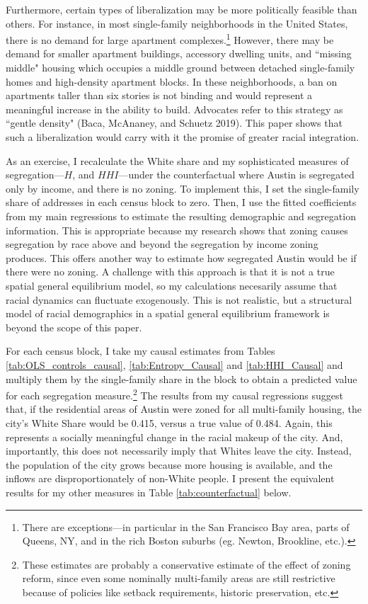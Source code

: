 \documentclass[11pt]{article}
\begin{document}
Furthermore, certain types of liberalization may be more politically feasible than others. For instance, in most single-family neighborhoods in the United States, there is no demand for large apartment complexes.\footnote{There are exceptions---in particular in the San Francisco Bay area, parts of Queens, NY, and in the rich Boston suburbs (eg. Newton, Brookline, etc.).} However, there may be demand for smaller apartment buildings, accessory dwelling units, and ``missing middle" housing which occupies a middle ground between detached single-family homes and high-density apartment blocks. In these neighborhoods, a ban on apartments taller than six stories is not binding and would represent a meaningful increase in the ability to build. Advocates refer to this strategy as ``gentle density" (Baca, McAnaney, and Schuetz 2019). This paper shows that such a liberalization would carry with it the promise of greater racial integration.

As an exercise, I recalculate the White share and my sophisticated measures of segregation---$H$, and $HHI$---under the counterfactual where Austin is segregated only by income, and there is no zoning. To implement this, I set the single-family share of addresses in each census block to zero. Then, I use the fitted coefficients from my main regressions to estimate the resulting demographic and segregation information. This is appropriate because my research shows that zoning causes segregation by race above and beyond the segregation by income zoning produces. This offers another way to estimate how segregated Austin would be if there were no zoning. A challenge with this approach is that it is not a true spatial general equilibrium model, so my calculations necesarily assume that racial dynamics can fluctuate exogenously. This is not realistic, but a structural model of racial demographics in a spatial general equilibrium framework is beyond the scope of this paper.

For each census block, I take my causal estimates from Tables \ref{tab:OLS_controls_causal}, \ref{tab:Entropy_Causal} and \ref{tab:HHI_Causal} and multiply them by the single-family share in the block to obtain a predicted value for each segregation measure.\footnote{These estimates are probably a conservative estimate of the effect of zoning reform, since even some nominally multi-family areas are still restrictive because of policies like setback requirements, historic preservation, etc.} The results from my causal regressions suggest that, if the residential areas of Austin were zoned for all multi-family housing, the city's White Share would be 0.415, versus a true value of 0.484. Again, this represents a socially meaningful change in the racial makeup of the city. And, importantly, this does not necessarily imply that Whites leave the city. Instead, the population of the city grows because more housing is available, and the inflows are disproportionately of non-White people. I present the equivalent results for my other measures in Table \ref{tab:counterfactual} below.
\end{document}
